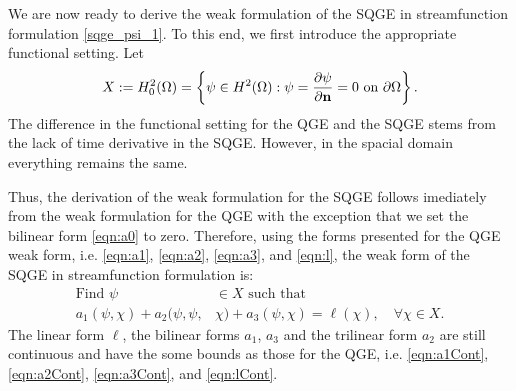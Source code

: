 We are now ready to derive the weak formulation of the SQGE in streamfunction formulation
\eqref{sqge_psi_1}. To this end, we first introduce the appropriate functional setting. Let
\begin{equation*}
  X := H^2_0(\Omega) = \left\{ \psi\in H^2(\Omega): \psi=\frac{\partial\psi}{\partial {\bf n}}=0
    \text{ on } \partial\Omega \right\} .  
\end{equation*}
The difference in the functional setting for the QGE and the SQGE stems from the lack of time
derivative in the SQGE. However, in the spacial domain everything remains the same.

Thus, the derivation of the weak formulation for the SQGE follows imediately from the weak formulation for
the QGE with the exception that we set the bilinear form \eqref{eqn:a0} to zero. Therefore, using
the forms presented for the QGE weak form, i.e.  \eqref{eqn:a1}, \eqref{eqn:a2}, \eqref{eqn:a3}, and
\eqref{eqn:l}, the weak form of the SQGE in streamfunction formulation is:
\begin{equation}
  \begin{split}
    \text{Find }\psi &\in X \text{ such that} \\
    a_1(\psi,\chi) + a_2(\psi,\psi,&\chi) + a_3(\psi,\chi)
    = \ell(\chi),\quad \forall \chi \in X.  
  \end{split}
  \label{eqn:SQGEWF}
\end{equation}
The linear form $\ell$, the bilinear forms $a_1$, $a_3$ and the trilinear form $a_2$ are still
continuous \cite{Cayco86} and have the some bounds as those for the QGE, i.e.  \eqref{eqn:a1Cont},
\eqref{eqn:a2Cont}, \eqref{eqn:a3Cont}, and \eqref{eqn:lCont}. 


